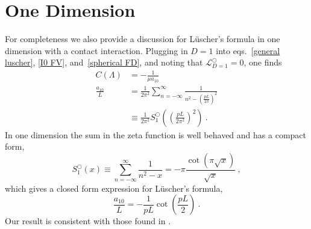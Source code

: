 \section{One Dimension}\label{sec:1D}
For completeness we also provide a discussion for L\"uscher's formula in one dimension with a contact interaction.  Plugging in $D=1$ into eqs.~\eqref{general luscher}, \eqref{I0 FV}, and~\eqref{spherical FD}, and noting that $\mathcal{L}_{D=1}^\bigcirc=0$, one finds 
\begin{align} 
C(\Lambda)&=-\frac{1}{\mu a_{10}}\\
\frac{a_{10}}{L} &=\frac{1}{2 \pi^{2}} \sum_{n=-\infty}^{\infty} \frac{1}{n^{2}-\left(\frac{p L}{2 \pi}\right)^{2}} \\ 
& \equiv \frac{1}{2 \pi^{2}} S^\bigcirc_{1}\left(\left(\frac{p L}{2 \pi^{2}}\right)^{2}\right)\ .
\end{align}
In one dimension the sum in the zeta function is well behaved and has a compact form,
\begin{equation}
S^\bigcirc_{1}(x) \equiv \sum_{n=-\infty}^{\infty} \frac{1}{n^{2}-x}=-\pi \frac{\cot (\pi \sqrt{x})}{\sqrt{x}}\ ,
\end{equation}
which gives a closed form expression for L\"uscher's formula,
\begin{equation}\label{eq:1d luscher}
\frac{a_{10}}{L} =-\frac{1}{pL}\cot\left(\frac{pL}{2}\right)\ . 
\end{equation}
Our result is consistent with those found in \cite{}.

